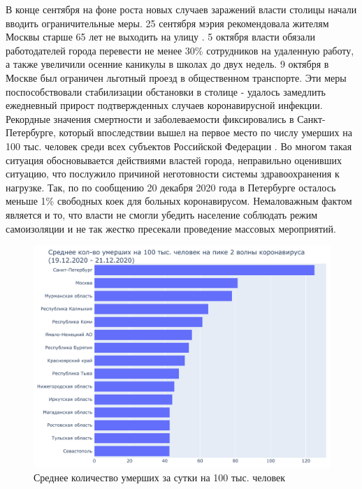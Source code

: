 \documentclass[a4paper, 12pt]{extarticle}
\begin{document}
В конце сентября на фоне роста новых случаев заражений власти столицы начали
вводить ограничительные меры. 25 сентября мэрия рекомендовала жителям Москвы
старше 65 лет не выходить на улицу . 5
октября власти обязали работодателей города перевести не менее 30\% сотрудников
на удаленную работу, а также увеличили осенние каникулы в школах до двух
недель. 9 октября в Москве был ограничен льготный проезд в общественном
транспорте. Эти меры поспособствовали стабилизации обстановки в столице -
удалось замедлить ежедневный прирост подтвержденных случаев коронавирусной
инфекции.
\\

Рекордные значения смертности и заболеваемости фиксировались в
Санкт-Петербурге, который впоследствии вышел на первое место по числу умерших
на 100 тыс. человек среди всех субъектов Российской Федерации
. Во многом такая ситуация
обосновывается действиями властей города, неправильно оценивших ситуацию, что
послужило причиной неготовности системы здравоохранения к нагрузке. Так, по по
сообщению 20 декабря 2020 года в Петербурге осталось меньше 1\% свободных коек
для больных коронавирусом. Немаловажным фактом является и то, что власти не
смогли убедить население соблюдать режим самоизоляции и не так жестко пресекали
проведение массовых мероприятий.
\\

\begin{figure}[h]
    \centering
    \includegraphics[scale=0.6]{../plots/6total_deaths_per_100k_bar_plot_2wave.pdf}
    \caption{Среднее количество умерших за сутки на 100 тыс. человек}
    \label{fig:average_deaths_per_100k_2wave}
\end{figure}
\end{document}
